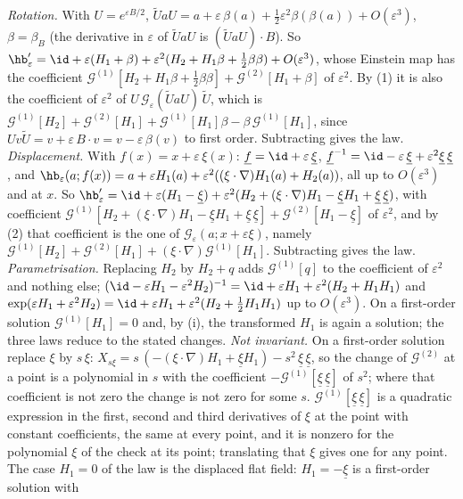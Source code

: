 \emph{Rotation.} With $U = e^{\varepsilon B/2}$, $\tilde U a U = a + \varepsilon\,\beta(a) + \tfrac12\varepsilon^{2}\beta(\beta(a)) + O(\varepsilon^{3})$, $\beta = \beta_{B}$ (the derivative in $\varepsilon$ of $\tilde U a U$ is $(\tilde U a U) \cdot B$). So $\hb'_{\varepsilon} = \id + \varepsilon(H_{1} + \beta) + \varepsilon^{2}(H_{2} + H_{1}\beta + \tfrac12\beta\beta) + O(\varepsilon^{3})$, whose Einstein map has the coefficient $\mathcal{G}^{(1)}[H_{2} + H_{1}\beta + \tfrac12\beta\beta] + \mathcal{G}^{(2)}[H_{1} + \beta]$ of $\varepsilon^{2}$. By (1) it is also the coefficient of $\varepsilon^{2}$ of $U\,\mathcal{G}_{\varepsilon}(\tilde U a U)\,\tilde U$, which is $\mathcal{G}^{(1)}[H_{2}] + \mathcal{G}^{(2)}[H_{1}] + \mathcal{G}^{(1)}[H_{1}]\beta - \beta\,\mathcal{G}^{(1)}[H_{1}]$, since $U v \tilde U = v + \varepsilon\,B \cdot v = v - \varepsilon\,\beta(v)$ to first order. Subtracting gives the law. \emph{Displacement.} With $f(x) = x + \varepsilon\,\xi(x)$: $\underline{f} = \id + \varepsilon\,\underline{\xi}$, $\underline{f}^{-1} = \id - \varepsilon\,\underline{\xi} + \varepsilon^{2}\underline{\xi}\,\underline{\xi}$, and $\hb_{\varepsilon}(a; f(x)) = a + \varepsilon H_{1}(a) + \varepsilon^{2}((\xi \cdot \nabla)H_{1}(a) + H_{2}(a))$, all up to $O(\varepsilon^{3})$ and at $x$. So $\hb'_{\varepsilon} = \id + \varepsilon(H_{1} - \underline{\xi}) + \varepsilon^{2}(H_{2} + (\xi \cdot \nabla)H_{1} - \underline{\xi}H_{1} + \underline{\xi}\,\underline{\xi})$, with coefficient $\mathcal{G}^{(1)}[H_{2} + (\xi \cdot \nabla)H_{1} - \underline{\xi}H_{1} + \underline{\xi}\,\underline{\xi}] + \mathcal{G}^{(2)}[H_{1} - \underline{\xi}]$ of $\varepsilon^{2}$, and by (2) that coefficient is the one of $\mathcal{G}_{\varepsilon}(a; x + \varepsilon\xi)$, namely $\mathcal{G}^{(1)}[H_{2}] + \mathcal{G}^{(2)}[H_{1}] + (\xi \cdot \nabla)\mathcal{G}^{(1)}[H_{1}]$. Subtracting gives the law. \emph{Parametrisation.} Replacing $H_{2}$ by $H_{2} + q$ adds $\mathcal{G}^{(1)}[q]$ to the coefficient of $\varepsilon^{2}$ and nothing else; $(\id - \varepsilon H_{1} - \varepsilon^{2}H_{2})^{-1} = \id + \varepsilon H_{1} + \varepsilon^{2}(H_{2} + H_{1}H_{1})$ and $\exp(\varepsilon H_{1} + \varepsilon^{2}H_{2}) = \id + \varepsilon H_{1} + \varepsilon^{2}(H_{2} + \tfrac12 H_{1}H_{1})$ up to $O(\varepsilon^{3})$. On a first-order solution $\mathcal{G}^{(1)}[H_{1}] = 0$ and, by (i), the transformed $H_{1}$ is again a solution; the three laws reduce to the stated changes. \emph{Not invariant.} On a first-order solution replace $\xi$ by $s\,\xi$: $X_{s\xi} = s\,(-(\xi \cdot \nabla)H_{1} + \underline{\xi}H_{1}) - s^{2}\,\underline{\xi}\,\underline{\xi}$, so the change of $\mathcal{G}^{(2)}$ at a point is a polynomial in $s$ with the coefficient $-\mathcal{G}^{(1)}[\underline{\xi}\,\underline{\xi}]$ of $s^{2}$; where that coefficient is not zero the change is not zero for some $s$. $\mathcal{G}^{(1)}[\underline{\xi}\,\underline{\xi}]$ is a quadratic expression in the first, second and third derivatives of $\xi$ at the point with constant coefficients, the same at every point, and it is nonzero for the polynomial $\xi$ of the check at its point; translating that $\xi$ gives one for any point. The case $H_{1} = 0$ of the law is the displaced flat field: $H_{1} = -\underline{\xi}$ is a first-order solution with 